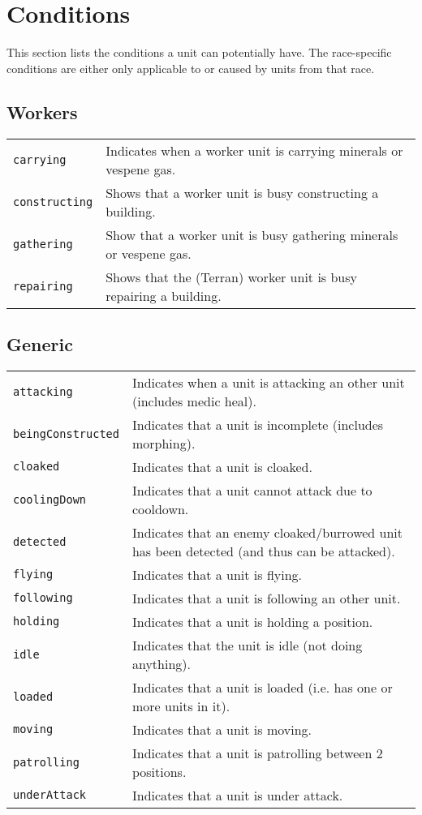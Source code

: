 \newpage
\section{Conditions}
\label{conditions}
This section lists the conditions a unit can potentially have. The race-specific conditions are either only applicable to or caused by units from that race.

\subsection{Workers}
\begin{tabularx}{\textwidth}{lX}
 \verb|carrying| & Indicates when a worker unit is carrying minerals or vespene gas. \\
 \verb|constructing| & Shows that a worker unit is busy constructing a building. \\
 \verb|gathering| & Show that a worker unit is busy gathering minerals or vespene gas. \\
 \verb|repairing| & Shows that the (Terran) worker unit is busy repairing a building.
\end{tabularx}

\subsection{Generic}
\begin{tabularx}{\textwidth}{lX}
 \verb|attacking| & Indicates when a unit is attacking an other unit (includes medic heal). \\
 \verb|beingConstructed| & Indicates that a unit is incomplete (includes morphing). \\
 \verb|cloaked| & Indicates that a unit is cloaked. \\
 \verb|coolingDown| & Indicates that a unit cannot attack due to cooldown. \\
 \verb|detected| & Indicates that an enemy cloaked/burrowed unit has been detected (and thus can be attacked). \\
 \verb|flying| & Indicates that a unit is flying. \\
 \verb|following| & Indicates that a unit is following an other unit. \\
 \verb|holding| & Indicates that a unit is holding a position. \\
 \verb|idle| & Indicates that the unit is idle (not doing anything). \\
 \verb|loaded| & Indicates that a unit is loaded (i.e. has one or more units in it). \\
 \verb|moving| & Indicates that a unit is moving. \\
 \verb|patrolling| & Indicates that a unit is patrolling between 2 positions. \\
 \verb|underAttack| & Indicates that a unit is under attack.
\end{tabularx}

